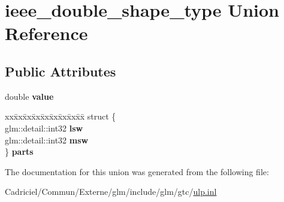 \hypertarget{unionieee__double__shape__type}{}\section{ieee\+\_\+double\+\_\+shape\+\_\+type Union Reference}
\label{unionieee__double__shape__type}
\subsection*{Public Attributes}
\begin{DoxyCompactItemize}
\item 
double {\bfseries value}\hypertarget{unionieee__double__shape__type_a2d9c4cab9e3fa74e4be6d72f798a145b}{}\label{unionieee__double__shape__type_a2d9c4cab9e3fa74e4be6d72f798a145b}

\item 
\begin{tabbing}
xx\=xx\=xx\=xx\=xx\=xx\=xx\=xx\=xx\=\kill
struct \{\\
\>glm::detail::int32 {\bfseries lsw}\\
\>glm::detail::int32 {\bfseries msw}\\
\} {\bfseries parts}\hypertarget{unionieee__double__shape__type_a5b93add2b09b4a829f81fd66656e9601}{}\label{unionieee__double__shape__type_a5b93add2b09b4a829f81fd66656e9601}
\\

\end{tabbing}\end{DoxyCompactItemize}


The documentation for this union was generated from the following file\+:\begin{DoxyCompactItemize}
\item 
Cadriciel/\+Commun/\+Externe/glm/include/glm/gtc/\hyperlink{ulp_8inl}{ulp.\+inl}\end{DoxyCompactItemize}
